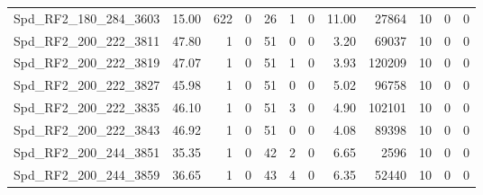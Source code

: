 \begin{longtable}[c]{@{}lrrrrrrrrrrr@{}}
Spd\_RF2\_180\_284\_3603     & 15.00                  & 622                     & 0                       & 26                     & 1                       & 0                       & 11.00                   & 27864                    & 10                       & 0                        & 0                        \\
Spd\_RF2\_200\_222\_3811     & 47.80                  & 1                       & 0                       & 51                     & 0                       & 0                       & 3.20                    & 69037                    & 10                       & 0                        & 0                        \\
Spd\_RF2\_200\_222\_3819     & 47.07                  & 1                       & 0                       & 51                     & 1                       & 0                       & 3.93                    & 120209                   & 10                       & 0                        & 0                        \\
Spd\_RF2\_200\_222\_3827     & 45.98                  & 1                       & 0                       & 51                     & 0                       & 0                       & 5.02                    & 96758                    & 10                       & 0                        & 0                        \\
Spd\_RF2\_200\_222\_3835     & 46.10                  & 1                       & 0                       & 51                     & 3                       & 0                       & 4.90                    & 102101                   & 10                       & 0                        & 0                        \\
Spd\_RF2\_200\_222\_3843     & 46.92                  & 1                       & 0                       & 51                     & 0                       & 0                       & 4.08                    & 89398                    & 10                       & 0                        & 0                        \\
Spd\_RF2\_200\_244\_3851     & 35.35                  & 1                       & 0                       & 42                     & 2                       & 0                       & 6.65                    & 2596                     & 10                       & 0                        & 0                        \\
Spd\_RF2\_200\_244\_3859     & 36.65                  & 1                       & 0                       & 43                     & 4                       & 0                       & 6.35                    & 52440                    & 10                       & 0                        & 0                        \\

\end{longtable}
